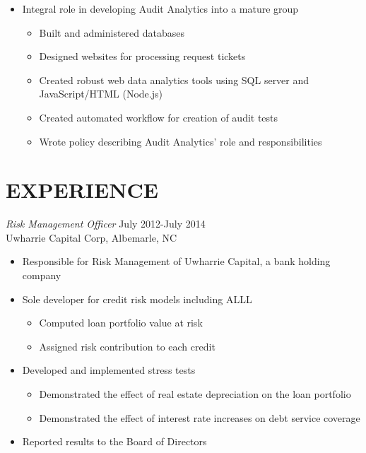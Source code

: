\documentclass{res}
\begin{document}
\begin{resume}
\begin{itemize}
                \item  Integral role in developing Audit Analytics into a mature group 
                
                \begin{itemize}
                
                \item Built and administered databases
                \item Designed websites for processing request tickets
                \item Created robust web data analytics tools using SQL server and JavaScript/HTML (Node.js)
                \item Created automated workflow for creation of audit tests      
                \item Wrote policy describing Audit Analytics' role and responsibilities
                \end{itemize}
\end{itemize}
\section{EXPERIENCE} {\sl Risk Management Officer} \hfill July 2012-July 2014 \\
Uwharrie Capital Corp, Albemarle, NC

 \begin{itemize}  %
                 \item Responsible for Risk Management of Uwharrie Capital, a bank holding company
                \item  Sole developer for credit risk models including ALLL
                \begin{itemize}
                \item Computed loan portfolio value at risk
                \item Assigned risk contribution to each credit
                \end{itemize}
                \item  Developed and implemented stress tests
                \begin{itemize}
                \item Demonstrated the effect of real estate depreciation on the loan portfolio
                \item Demonstrated the effect of interest rate increases on debt service coverage
                \end{itemize}
                \item Reported results to the Board of Directors
                \end{itemize}
                


\end{resume}
\end{document}
